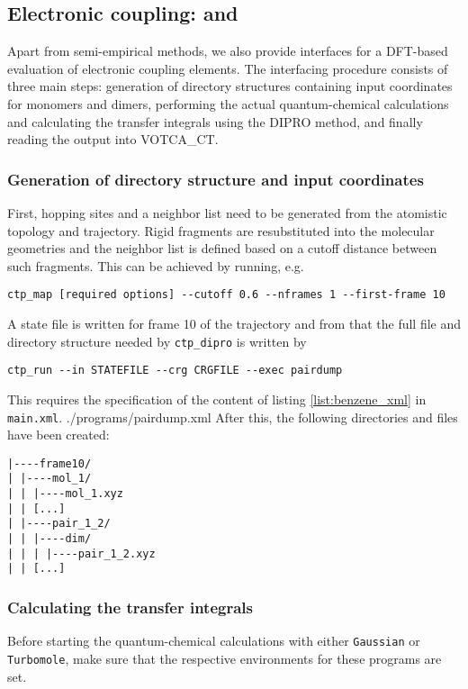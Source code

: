 \subsection{Electronic coupling: \gaussian and \turbomole}

Apart from semi-empirical methods, we also provide interfaces for a DFT-based evaluation of electronic coupling elements. The interfacing procedure consists of three main steps: generation of directory structures containing input coordinates for monomers and dimers, performing the actual quantum-chemical calculations and calculating the transfer integrals using the DIPRO method, and finally reading the output into VOTCA\_CT.
\subsubsection{Generation of directory structure and input coordinates}
First, hopping sites and a neighbor list need to be generated from the atomistic topology and trajectory. Rigid fragments are resubstituted into the molecular geometries and the neighbor list is defined based on a cutoff distance between such fragments. This can be achieved by running, e.g.  
\begin{verbatim}
ctp_map [required options] --cutoff 0.6 --nframes 1 --first-frame 10
\end{verbatim}
A state file is written for frame 10 of the trajectory and from that the full file and directory structure needed by {\tt ctp\_dipro} is written by 
\begin{verbatim}
ctp_run --in STATEFILE --crg CRGFILE --exec pairdump
\end{verbatim}
This requires the specification of the content of listing \ref{list:benzene_xml} in {\tt main.xml}.
 {./programs/pairdump.xml}
After this, the following directories and files have been created:
\begin{verbatim}
|----frame10/
| |----mol_1/
| | |----mol_1.xyz
| | [...]
| |----pair_1_2/
| | |----dim/
| | | |----pair_1_2.xyz
| | [...]
\end{verbatim}

\subsubsection{Calculating the transfer integrals}
Before starting the quantum-chemical calculations with either {\tt Gaussian} or {\tt Turbomole}, make sure that the respective environments for these programs are set. 

